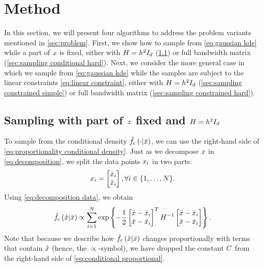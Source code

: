 \section{Method}
\label{sec:method}

\cstarta In this section, we will present four algorithms to address the problem variants mentioned in \cref{sec:problem}.
First, we show how to sample from \cref{eq:gaussian kde} while a part of $x$ is fixed, either with $H=h^2I_{d}$ (\cref{sec:sampling conditional simple}) or full bandwidth matrix (\cref{sec:sampling conditional hard}).
Next, we consider the more general case in which we sample from \cref{eq:gaussian kde} while the samples are subject to the linear constraints \cref{eq:linear constraint}, either with $H=h^2I_{d}$ (\cref{sec:sampling constrained simple}) or full bandwidth matrix (\cref{sec:sampling constrained hard}). \cenda



\subsection{Sampling with part of $x$ fixed and $H=h^2I_{d}$}
\label{sec:sampling conditional simple}

To sample from the conditional density $\hat{f}_{\mathrm{c}}\left( \cdot | \bar{x} \right)$, we can use the right-hand side of \cref{eq:proportionality conditional density}.
Just as we decompose $x$ in \cref{eq:decomposition}, we split the data points $x_{i}$ in two parts:
\begin{equation}
	\label{eq:decomposition data}
	x_{i} = \begin{bmatrix}
		\bar{x}_{i} \\ \hat{x}_{i}
	\end{bmatrix}, \forall i \in \{1,\ldots,N\}.
\end{equation}
Using \cref{eq:decomposition data}, we obtain
\begin{equation}
	\label{eq:conditional proportional}
	\hat{f}_{\mathrm{c}}\left( \hat{x} | \bar{x} \right)
	\propto \sum_{i=1}^{N} 
	\exp\left\{ 
		-\frac{1}{2} 
		\begin{bmatrix}
			\bar{x} - \bar{x}_{i} \\ 
			\hat{x} - \hat{x}_{i}
		\end{bmatrix}^T 
		H^{-1}
		\begin{bmatrix}
			\bar{x} - \bar{x}_{i} \\ 
			\hat{x} - \hat{x}_{i}
		\end{bmatrix}
	 \right\}.
\end{equation}
\cstarta Note that because we describe how $\hat{f}_{\mathrm{c}}\left( \hat{x} | \bar{x} \right)$ changes proportionally with terms that contain $\hat{x}$ (hence, the $\propto$-symbol), we have dropped the constant $C$ from the right-hand side of \cref{eq:conditional proportional}. \cenda

